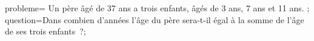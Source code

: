 \documentclass[exercice]{thedocument}%
\begin{document}
%
    \>probleme={%
    Un père âgé de 37 ans a trois enfants, âgés de 3 ans, 7 ans et 11 ans.%
    };%
    \>question=Dans combien d'années l'âge du père sera-t-il égal à la somme de l'âge de%
    ses trois enfants~?;
\end{document}
